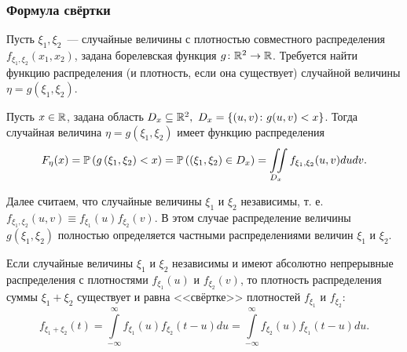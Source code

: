\subsubsection{Формула свёртки}
Пусть $\xi_1, \xi_2$~--- случайные величины с плотностью совместного распределения $f_{\xi_{1}, \xi_{2}}\left(x_{1}, x_{2}\right)$, задана борелевская функция $g\colon \mathbb{R}^{2} \to \mathbb{R}$. 
Требуется найти функцию распределения (и плотность, если она существует) случайной величины $\eta=g\left(\xi_{1}, \xi_{2}\right)$.
\begin{lem}
    Пусть $x \in \mathbb{R}$, задана область $D_{x} \subseteq \mathbb{R}^{2},~ D_x = \{(u,v)\colon g(u,v) < x\}$. Тогда случайная величина $\eta=g\left(\xi_{1}, \xi_{2}\right)$ имеет функцию распределения
    \begin{equation*}
        F_{\eta}(x)=\operatorname{\mathbb{P}}\left(g\left(\xi_{1}, \xi_{2}\right)<x\right)=\operatorname{\mathbb{P}}\left(\left(\xi_{1}, \xi_{2}\right) \in D_{x}\right)=\iint\limits_{D_{x}} f_{\xi_{1}, \xi_{2}}(u, v) du dv.
    \end{equation*}
\end{lem}
Далее считаем, что случайные величины $\xi_1$ и $\xi_2$ независимы, т. е. $f_{\xi_{1}, \xi_{2}}(u, v) \equiv f_{\xi_{1}}(u) f_{\xi_{2}}(v)$. В этом случае распределение величины $g\left(\xi_{1}, \xi_{2}\right)$ полностью определяется частными распределениями величин $\xi_1$ и $\xi_2$.
\begin{namedthm}
    Если случайные величины $\xi_1$ и $\xi_2$ независимы и имеют абсолютно непрерывные распределения с плотностями $f_{\xi_{1}}(u)$ и $f_{\xi_{2}}(v)$, то плотность распределения суммы $\xi_{1}+\xi_{2}$ существует и равна <<свёртке>> плотностей $f_{\xi_{1}}$ и $f_{\xi_{2}}$:
    \begin{equation*}
        f_{\xi_{1}+\xi_{2}}(t)=\int\limits_{-\infty}^{\infty} f_{\xi_{1}}(u) f_{\xi_{2}}(t-u) du=\int\limits_{-\infty}^{\infty} f_{\xi_{2}}(u) f_{\xi_{1}}(t-u) du.
    \end{equation*}
\end{namedthm}

